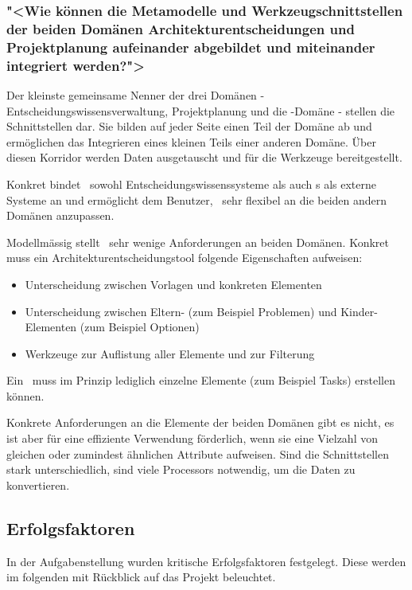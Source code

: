 		
		\subsubsection{"<Wie können die Metamodelle und Werkzeugschnittstellen der beiden Domänen Architekturentscheidungen und Projektplanung aufeinander abgebildet und miteinander integriert werden?">}
			Der kleinste gemeinsame Nenner der drei Domänen - Entscheidungswissensverwaltung, Projektplanung und die \eeppi -\-Domäne - stellen die Schnittstellen dar.
			Sie bilden auf jeder Seite einen Teil der Domäne ab und ermöglichen das Integrieren eines kleinen Teils einer anderen Domäne. 
			Über diesen Korridor werden Daten ausgetauscht und für die Werkzeuge bereitgestellt.
		
			Konkret bindet \eeppi\ sowohl Entscheidungswissenssysteme als auch \ppt s als externe Systeme an
			und ermöglicht dem Benutzer, \eeppi\ sehr flexibel an die beiden andern Domänen anzupassen.
			
			Modellmässig stellt \eeppi\ sehr wenige Anforderungen an beiden Domänen.
			Konkret muss ein Architekturentscheidungstool folgende Eigenschaften aufweisen:
			\begin{itemize}
				\item{Unterscheidung zwischen Vorlagen und konkreten Elementen}
				\item{Unterscheidung zwischen Eltern- (zum Beispiel Problemen) und Kinder-Elementen (zum Beispiel Optionen)}
				\item{Werkzeuge zur Auflistung aller Elemente und zur Filterung}
			\end{itemize}
			
			Ein \ppt\ muss im Prinzip lediglich einzelne Elemente (zum Beispiel Tasks) erstellen können.
			
			Konkrete Anforderungen an die Elemente der beiden Domänen gibt es nicht,
			es ist aber für eine effiziente Verwendung förderlich,
			wenn sie eine Vielzahl von gleichen oder zumindest ähnlichen Attribute aufweisen.
			Sind die Schnittstellen stark unterschiedlich, sind viele Processors notwendig, um die Daten zu konvertieren.
			

	\subsection{Erfolgsfaktoren}
		In der Aufgabenstellung wurden kritische Erfolgsfaktoren festgelegt.
		Diese werden im folgenden mit Rückblick auf das Projekt beleuchtet.
		
